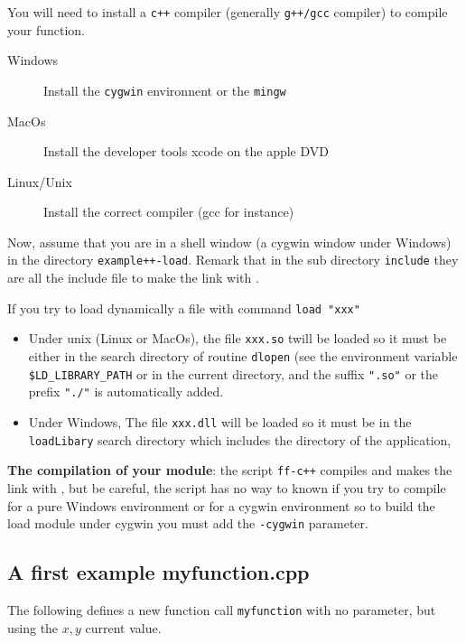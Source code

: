 \documentclass[a4paper,twoside,12pt]{book}
\begin{document}
You will need to install a \texttt{c++} compiler  (generally \texttt{g++/gcc} compiler)
 to compile your function.


\begin{description}
\item[Windows] Install the \texttt{cygwin} environnent or the \texttt{mingw}
\item[MacOs] Install the developer tools xcode on the apple DVD
\item[Linux/Unix] Install the correct compiler  (gcc for instance)
\end{description}

Now, assume  that you are in a shell window (a cygwin window under Windows)  in the directory
\texttt{example++-load}. Remark that  in the sub directory \texttt{include}
they are all the \freefempp include file to make the link with \freefempp.



\begin{note}
  If you try to load dynamically a file with command \texttt{load "xxx"}
 \begin{itemize}
 \item Under unix (Linux or MacOs), the file \texttt{xxx.so}  twill be loaded so it must be either
 in the search directory of routine \texttt{dlopen}
  (see the environment variable  \verb.$LD_LIBRARY_PATH. or in
  the current directory, and the suffix \texttt{".so"} or the prefix \texttt{"./"} is automatically added.

  \item   Under Windows,
  The file \texttt{xxx.dll}  will be loaded so it must be in
  the \texttt{loadLibary} search directory which includes the directory of the application,
 \end{itemize}
\end{note}

{\bf The compilation of your module}:
the script \texttt{ff-c++} compiles and makes
the link with \freefempp, but be careful, the script
has no way to known if you try to compile for a
pure Windows environment or for a cygwin environment
so to build the load module under cygwin  you must add
the \texttt{-cygwin} parameter.

\subsection{A first example myfunction.cpp}

The following  defines a new function call \texttt{myfunction} with no parameter, but using the $x,y$ current value.
\end{document}
